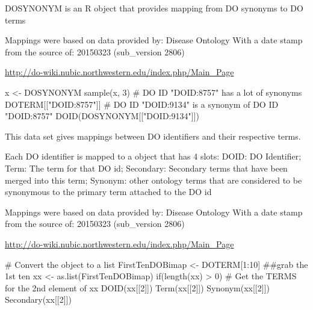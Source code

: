\documentclass[a4paper]{book}
\begin{document}
%
\begin{Description}\relax
DOSYNONYM is an R object that provides mapping
from DO synonyms to DO terms
\end{Description}
%
\begin{Details}\relax
Mappings were based on data provided by: Disease Ontology
With a date stamp from the source of: 20150323 (sub\_version 2806)


\end{Details}
%
\begin{References}\relax
\url{http://do-wiki.nubic.northwestern.edu/index.php/Main_Page} 

\end{References}
%
\begin{Examples}
\begin{ExampleCode}
    x <- DOSYNONYM
    sample(x, 3)
    # DO ID "DOID:8757" has a lot of synonyms
    DOTERM[["DOID:8757"]]
    # DO ID "DOID:9134" is a synonym of DO ID "DOID:8757"
    DOID(DOSYNONYM[["DOID:9134"]])
\end{ExampleCode}
\end{Examples}
%
\begin{Description}\relax
This data set gives mappings between DO identifiers and their respective terms.
\end{Description}
%
\begin{Details}\relax
Each DO identifier is mapped to a  object that has 4 slots:
DOID: DO Identifier;
Term: The term for that DO id;
Secondary: Secondary terms that have been merged into this term;
Synonym: other  ontology terms that are considered to be synonymous to the primary
term attached to the DO id


Mappings were based on data provided by: Disease Ontology
With a date stamp from the source of: 20150323 (sub\_version 2806)


\end{Details}
%
\begin{References}\relax
\url{http://do-wiki.nubic.northwestern.edu/index.php/Main_Page} 

\end{References}
%
\begin{Examples}
\begin{ExampleCode}
    # Convert the object to a list
    FirstTenDOBimap <- DOTERM[1:10] ##grab the 1st ten
    xx <- as.list(FirstTenDOBimap)
     if(length(xx) > 0){
        # Get the TERMS for the 2nd element of xx
        DOID(xx[[2]])
        Term(xx[[2]])
        Synonym(xx[[2]])
        Secondary(xx[[2]])
    }
\end{ExampleCode}
\end{Examples}
\end{document}
